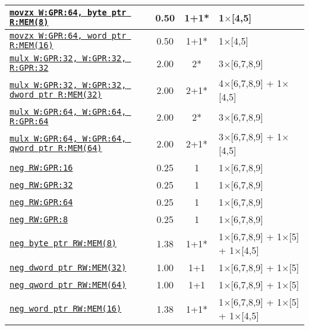 \documentclass[a4paper,english,fontsize=9]{scrartcl}
\begin{document}
\begin{longtable}{p{}ccL{.25\textwidth}}
  \midrule
  \texttt{\href{https://felixcloutier.com/x86/MOVZX.html}{movzx W:GPR:64, byte ptr R:MEM(8)}} & 0.50 & 1+1* & 1\(\times\)[4,5] \\
  \midrule
  \texttt{\href{https://felixcloutier.com/x86/MOVZX.html}{movzx W:GPR:64, word ptr R:MEM(16)}} & 0.50 & 1+1* & 1\(\times\)[4,5] \\
  \midrule
  \texttt{\href{https://felixcloutier.com/x86/MULX.html}{mulx W:GPR:32, W:GPR:32, R:GPR:32}} & 2.00 & 2* & 3\(\times\)[6,7,8,9] \\
  \midrule
  \texttt{\href{https://felixcloutier.com/x86/MULX.html}{mulx W:GPR:32, W:GPR:32, dword ptr R:MEM(32)}} & 2.00 & 2+1* & 4\(\times\)[6,7,8,9] + 1\(\times\)[4,5] \\
  \midrule
  \texttt{\href{https://felixcloutier.com/x86/MULX.html}{mulx W:GPR:64, W:GPR:64, R:GPR:64}} & 2.00 & 2* & 3\(\times\)[6,7,8,9] \\
  \midrule
  \texttt{\href{https://felixcloutier.com/x86/MULX.html}{mulx W:GPR:64, W:GPR:64, qword ptr R:MEM(64)}} & 2.00 & 2+1* & 3\(\times\)[6,7,8,9] + 1\(\times\)[4,5] \\
  \midrule
  \texttt{\href{https://felixcloutier.com/x86/NEG.html}{neg RW:GPR:16}} & 0.25 & 1 & 1\(\times\)[6,7,8,9] \\
  \midrule
  \texttt{\href{https://felixcloutier.com/x86/NEG.html}{neg RW:GPR:32}} & 0.25 & 1 & 1\(\times\)[6,7,8,9] \\
  \midrule
  \texttt{\href{https://felixcloutier.com/x86/NEG.html}{neg RW:GPR:64}} & 0.25 & 1 & 1\(\times\)[6,7,8,9] \\
  \midrule
  \texttt{\href{https://felixcloutier.com/x86/NEG.html}{neg RW:GPR:8}} & 0.25 & 1 & 1\(\times\)[6,7,8,9] \\
  \midrule
  \texttt{\href{https://felixcloutier.com/x86/NEG.html}{neg byte ptr RW:MEM(8)}} & 1.38 & 1+1* & 1\(\times\)[6,7,8,9] + 1\(\times\)[5] + 1\(\times\)[4,5] \\
  \midrule
  \texttt{\href{https://felixcloutier.com/x86/NEG.html}{neg dword ptr RW:MEM(32)}} & 1.00 & 1+1 & 1\(\times\)[6,7,8,9] + 1\(\times\)[5] \\
  \midrule
  \texttt{\href{https://felixcloutier.com/x86/NEG.html}{neg qword ptr RW:MEM(64)}} & 1.00 & 1+1 & 1\(\times\)[6,7,8,9] + 1\(\times\)[5] \\
  \midrule
  \texttt{\href{https://felixcloutier.com/x86/NEG.html}{neg word ptr RW:MEM(16)}} & 1.38 & 1+1* & 1\(\times\)[6,7,8,9] + 1\(\times\)[5] + 1\(\times\)[4,5] \\
  \midrule

\end{longtable}
\end{document}
